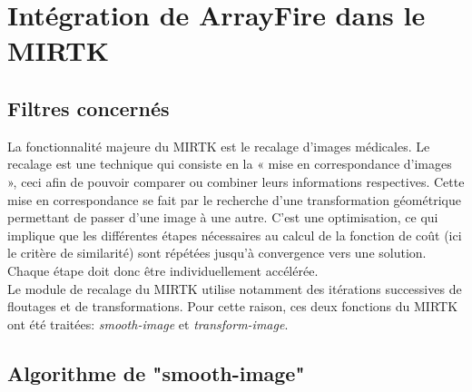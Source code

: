 \documentclass[10pt]{report}
\begin{document}
	\section{Intégration de ArrayFire dans le MIRTK}
	\subsection{Filtres concernés}
	La fonctionnalité majeure du MIRTK est le recalage d'images médicales. Le recalage est une technique qui consiste en la « mise en correspondance d'images », ceci afin de pouvoir comparer ou combiner leurs informations respectives. Cette mise en correspondance se fait par le recherche d'une transformation géométrique permettant de passer d'une image à une autre. C'est une optimisation, ce qui implique que les différentes étapes nécessaires au calcul de la fonction de coût (ici le critère de similarité) sont répétées jusqu'à
	 convergence vers une solution. Chaque étape doit donc être individuellement accélérée.\\
	Le module de recalage du MIRTK utilise notamment des itérations successives de floutages et de transformations. Pour cette raison, ces deux fonctions du MIRTK ont été traitées: \textit{smooth-image} et \textit{transform-image}.
	\newpage
	\subsection{Algorithme de "smooth-image"}
\end{document}
